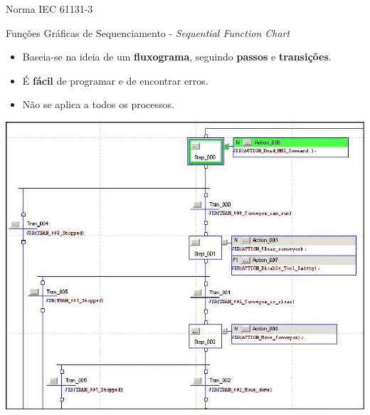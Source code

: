 \begin{frame}{Norma IEC 61131-3}
	\begin{block}{Funções Gráficas de Sequenciamento - \textit{Sequential Function Chart}}
		\begin{itemize}
			\item Baseia-se na ideia de um \textbf{fluxograma}, seguindo \textbf{passos} e \textbf{transições}.
			\item É \textbf{fácil} de programar e de encontrar erros.
			\item Não se aplica a todos os processos.
		\end{itemize}
	\end{block}

	\centering
	
	\includegraphics[height=0.6\textheight]{Figuras/Ch10/fig5}
\end{frame}


